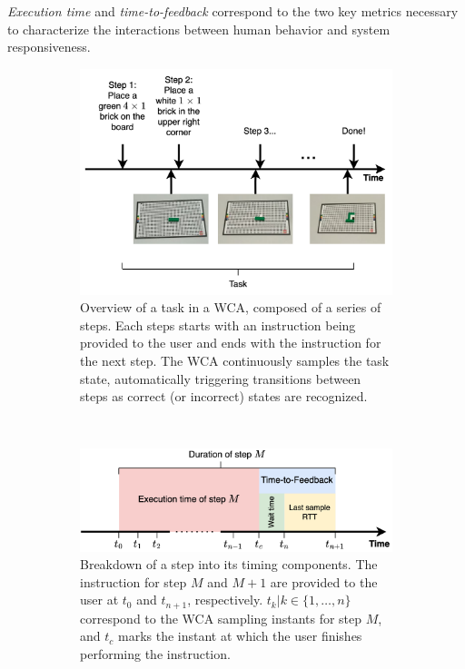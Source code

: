 \emph{Execution time} and \emph{time-to-feedback} correspond to the two key metrics necessary to characterize the interactions between human behavior and system responsiveness.

\begin{figure}
    \centering
    \begin{subfigure}{\columnwidth}
        \centering
        \includegraphics[width=\columnwidth]{figs/task.png}
        \caption{%
            Overview of a task in a \ac{WCA}, composed of a series of steps.
            Each steps starts with an instruction being provided to the user and ends with the instruction for the next step.
            The \ac{WCA} continuously samples the task state, automatically triggering transitions between steps as correct (or incorrect) states are recognized.
        }\label{fig:task}
    \end{subfigure}\\
    \begin{subfigure}{\columnwidth}
        \centering
        \includegraphics[width=\columnwidth]{figs/step_time.png}
        \caption{%
            Breakdown of a step into its timing components.
            The instruction for step \( M \) and \( M + 1 \) are provided to the user at \( t_0 \) and \( t_{n+1} \), respectively.
            \( t_k | k \in \{1, \ldots, n \} \) correspond to the \ac{WCA} sampling instants for step \( M \), and \( t_c \) marks the instant at which the user finishes performing the instruction.
        }\label{fig:step}
    \end{subfigure}
    \caption{}
\end{figure}

